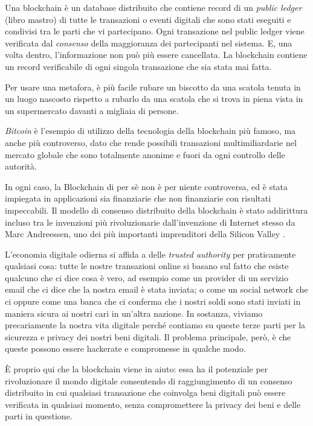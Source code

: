 Una blockchain è un database distribuito che contiene record di un \textit{public ledger} (libro mastro) di tutte le transazioni o eventi digitali che sono stati eseguiti e condivisi tra le parti che vi partecipano. Ogni transazione nel public ledger viene verificata dal \textit{consenso} della maggioranza dei partecipanti nel sistema. E, una volta dentro, l'informazione non può più essere cancellata. La blockchain contiene un record verificabile di ogni singola transazione che sia stata mai fatta.

Per usare una metafora, è più facile rubare un biscotto da una scatola tenuta in un luogo nascosto rispetto a rubarlo da una scatola che si trova in piena vista in un supermercato davanti a migliaia di persone.

\textit{Bitcoin} è l'esempio di utilizzo della tecnologia della blockchain più famoso, ma anche più controverso, dato che rende possibili transazioni multimiliardarie nel mercato globale che sono totalmente anonime e fuori da ogni controllo delle autorità. 

In ogni caso, la Blockchain di per sè non è per niente controversa, ed è stata impiegata in applicazioni sia finanziarie che non finanziarie con risultati impeccabili. Il modello di consenso distribuito della blockchain è stato addirittura incluso tra le invenzioni più rivoluzionarie dall'invenzione di Internet stesso da Marc Andreessen, uno dei più importanti imprenditori della Silicon Valley \cite{Crosby2016}.

L'economia digitale odierna si affida a delle \textit{trusted authority} per praticamente qualsiasi cosa: tutte le nostre transazioni online si basano sul fatto che esiste qualcuno che ci dice cosa è vero, ad esempio come un provider di un servizio email che ci dice che la nostra email è stata inviata; o come un social network che ci oppure come una banca che ci conferma che i nostri soldi sono stati inviati in maniera sicura ai nostri cari in un'altra nazione. In sostanza, viviamo precariamente la nostra vita digitale perch\'e contiamo su queste terze parti per la sicurezza e privacy dei nostri beni digitali. Il problema principale, però, è che queste possono essere hackerate e compromesse in qualche modo.

È proprio qui che la blockchain viene in aiuto: essa ha il potenziale per rivoluzionare il mondo digitale consentendo di raggiungimento di un consenso distribuito in cui qualsiasi transazione che coinvolga beni digitali può essere verificata in qualsiasi momento, senza compromettere la privacy dei beni e delle parti in questione. 

